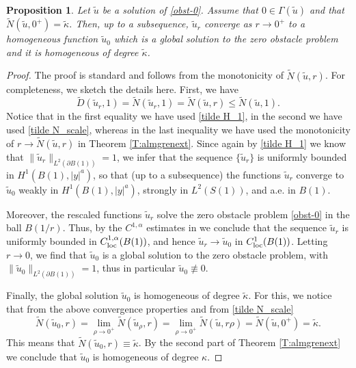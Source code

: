 \documentclass[11pt]{amsart}
\theoremstyle{plain}
\newtheorem{prop}[thrm]{Proposition}
\numberwithin{equation}{section}
\begin{document}
\begin{prop}\label{blow-ups-0}
Let $\tilde u$ be a solution of \eqref{obst-0}.
Assume that $0\in \Gamma(\tilde u)$ and that $\tilde N(\tilde u,0^+)=\tilde \kappa$.
Then, up to a subsequence, $\tilde u_r$ converge as $r\to 0^+$ to a homogeneous function $\tilde u_0$ which is a global solution to the zero obstacle problem and it is homogeneous of degree $\tilde \kappa$.
\end{prop}

\begin{proof}
The proof is standard and follows from the monotonicity of $\tilde N(\tilde u,r)$.
For completeness, we sketch the details here.
First, we have
\[
\tilde D(\tilde u_r,1) = \tilde N(\tilde u_r,1) = \tilde N(\tilde u,r) \le \tilde N(\tilde u,1).
\]
Notice that in the first equality we have used \eqref{tilde H_1}, in the second we have used \eqref{tilde N_scale}, whereas in the last inequality we have used the monotonicity of $r\to \tilde N(\tilde u,r)$ in Theorem \ref{T:almgrenext}. Since again by \eqref{tilde H_1} we know that $\|\tilde u_r\|_{L^2(\partial B(1))}=1$, we infer that the sequence $\{\tilde u_r\}$ is uniformly bounded in $H^1(B(1),|y|^a)$, so that (up to a subsequence) the functions $\tilde u_r$ converge to $\tilde u_0$ weakly in $H^1(B(1),|y|^a)$, strongly in $L^2(S(1))$, and a.e. in $B(1)$.

Moreover, the rescaled functions $\tilde u_r$ solve the zero obstacle problem \eqref{obst-0} in the ball $B(1/r)$.
Thus, by the $C^{1,\alpha}$ estimates in \cite{CSS} we conclude that the sequence $\tilde u_r$ is uniformly bounded in $C^{1,\alpha}_{\rm loc}(B(1))$, and hence $\tilde u_r\to \tilde u_0$ in $C^1_{\rm loc}(B(1))$.
Letting $r\to0$, we find that $\tilde u_0$ is a global solution to the zero obstacle problem, with $\|\tilde u_0\|_{L^2(\partial B(1))}=1$, thus in particular $\tilde u_0\not\equiv 0$.

Finally, the global solution $\tilde u_0$ is homogeneous of degree $\tilde \kappa$.
For this, we notice that from the above convergence properties and from \eqref{tilde N_scale}
\[\tilde N(\tilde u_0,r)=\lim_{\rho\to0^+}\tilde N(\tilde u_\rho,r)=\lim_{\rho\to0^+}\tilde N(\tilde u,r\rho)=\tilde N(\tilde u,0^+) = \tilde \kappa.\]
This means that $\tilde N(\tilde u_0,r)\equiv \tilde \kappa$. By the second part of Theorem \ref{T:almgrenext} we conclude that $\tilde u_0$ is homogeneous of degree $\kappa$.

\end{proof}
\end{document}
